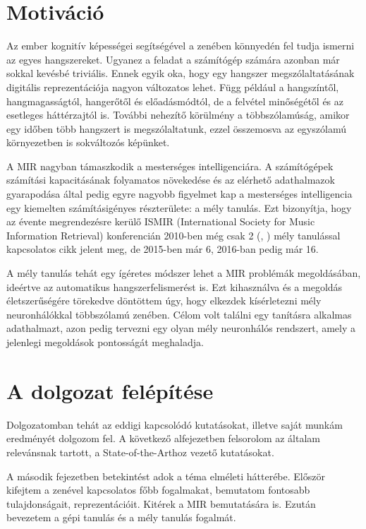 \section{Motiváció}

Az ember kognitív képességei segítségével a zenében könnyedén fel tudja ismerni az egyes hangszereket. Ugyanez a feladat a számítógép számára azonban már sokkal kevésbé triviális. Ennek egyik oka, hogy egy hangszer megszólaltatásának digitális reprezentációja nagyon változatos lehet. Függ például a hangszíntől, hangmagasságtól, hangerőtől és előadásmódtól, de a felvétel minőségétől és az esetleges háttérzajtól is. További nehezítő körülmény a többszólamúság, amikor egy időben több hangszert is megszólaltatunk, ezzel összemosva az egyszólamú környezetben is sokváltozós képünket.

A MIR nagyban támaszkodik a mesterséges intelligenciára. A számítógépek számítási kapacitásának folyamatos növekedése és az elérhető adathalmazok gyarapodása által pedig egyre nagyobb figyelmet kap a mesterséges intelligencia egy kiemelten számításigényes részterülete: a mély tanulás. Ezt bizonyítja, hogy az évente megrendezésre kerülő ISMIR (International Society for Music Information Retrieval) konferencián 2010-ben még csak 2 (\cite{florian2010}, \cite{Hamel2010}) mély tanulással kapcsolatos cikk jelent meg, de 2015-ben már 6, 2016-ban pedig már 16. \cite{choi2017tutorial}

A mély tanulás tehát egy ígéretes módszer lehet a MIR problémák megoldásában, ideértve az automatikus hangszerfelismerést is. Ezt kihasználva és a megoldás életszerűségére törekedve döntöttem úgy, hogy elkezdek kísérletezni mély neuronhálókkal többszólamú zenében. Célom volt találni egy tanításra alkalmas adathalmazt, azon pedig tervezni egy olyan mély neuronhálós rendszert, amely a jelenlegi megoldások pontosságát meghaladja.

\section{A dolgozat felépítése}

Dolgozatomban tehát az eddigi kapcsolódó kutatásokat, illetve saját munkám eredményét dolgozom fel. A következő alfejezetben felsorolom az általam relevánsnak tartott, a State-of-the-Arthoz vezető kutatásokat. 

A második fejezetben betekintést adok a téma elméleti hátterébe. Először kifejtem a zenével kapcsolatos főbb fogalmakat, bemutatom fontosabb tulajdonságait, reprezentációit. Kitérek a MIR bemutatására is. Ezután bevezetem a gépi tanulás és a mély tanulás fogalmát. 

